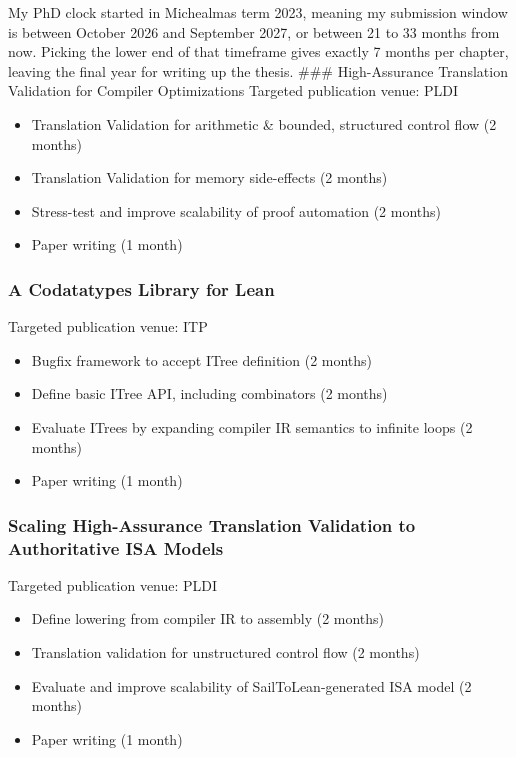 My PhD clock started in Michealmas term 2023, meaning my submission
window is between October 2026 and September 2027, or between 21 to 33
months from now. Picking the lower end of that timeframe gives exactly 7
months per chapter, leaving the final year for writing up the thesis.
\#\#\# High-Assurance Translation Validation for Compiler Optimizations
Targeted publication venue: PLDI

\begin{itemize}
\tightlist
\item
  Translation Validation for arithmetic \& bounded, structured control
  flow (2 months)
\item
  Translation Validation for memory side-effects (2 months)
\item
  Stress-test and improve scalability of proof automation (2 months)
\item
  Paper writing (1 month)
\end{itemize}

\subsubsection{A Codatatypes Library for
Lean}\label{a-codatatypes-library-for-lean-1}

Targeted publication venue: ITP

\begin{itemize}
\tightlist
\item
  Bugfix framework to accept ITree definition (2 months)
\item
  Define basic ITree API, including combinators (2 months)
\item
  Evaluate ITrees by expanding compiler IR semantics to infinite loops
  (2 months)
\item
  Paper writing (1 month)
\end{itemize}

\subsubsection{Scaling High-Assurance Translation Validation to
Authoritative ISA
Models}\label{scaling-high-assurance-translation-validation-to-authoritative-isa-models-1}

Targeted publication venue: PLDI

\begin{itemize}
\tightlist
\item
  Define lowering from compiler IR to assembly (2 months)
\item
  Translation validation for unstructured control flow (2 months)
\item
  Evaluate and improve scalability of SailToLean-generated ISA model (2
  months)
\item
  Paper writing (1 month)
\end{itemize}
